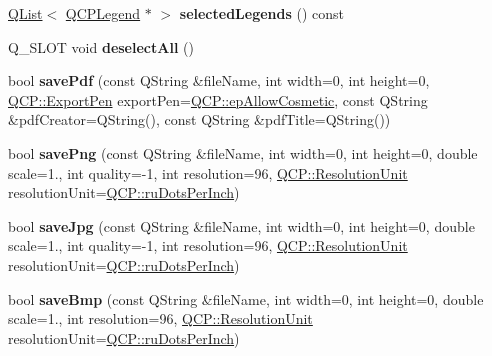 \begin{DoxyCompactItemize}
\item 
\hyperlink{class_q_list}{Q\+List}$<$ \hyperlink{class_q_c_p_legend}{Q\+C\+P\+Legend} $\ast$ $>$ {\bfseries selected\+Legends} () const \hypertarget{class_q_custom_plot_aafa931a82d7568af2ca51e5f939ff39a}{}\label{class_q_custom_plot_aafa931a82d7568af2ca51e5f939ff39a}

\item 
Q\+\_\+\+S\+L\+OT void {\bfseries deselect\+All} ()\hypertarget{class_q_custom_plot_a3b2698464e81b0771bdcaeb5bd306886}{}\label{class_q_custom_plot_a3b2698464e81b0771bdcaeb5bd306886}

\item 
bool {\bfseries save\+Pdf} (const Q\+String \&file\+Name, int width=0, int height=0, \hyperlink{namespace_q_c_p_a17844f19e1019693a953e1eb93536d2f}{Q\+C\+P\+::\+Export\+Pen} export\+Pen=\hyperlink{namespace_q_c_p_a17844f19e1019693a953e1eb93536d2fa34716c7388ad3a2ff3ac27e57fb83a5b}{Q\+C\+P\+::ep\+Allow\+Cosmetic}, const Q\+String \&pdf\+Creator=Q\+String(), const Q\+String \&pdf\+Title=Q\+String())\hypertarget{class_q_custom_plot_ad5acd34f6b39c3516887d7e54fec2412}{}\label{class_q_custom_plot_ad5acd34f6b39c3516887d7e54fec2412}

\item 
bool {\bfseries save\+Png} (const Q\+String \&file\+Name, int width=0, int height=0, double scale=1., int quality=-\/1, int resolution=96, \hyperlink{namespace_q_c_p_a715d46153da230990aa887d0f0602452}{Q\+C\+P\+::\+Resolution\+Unit} resolution\+Unit=\hyperlink{namespace_q_c_p_a715d46153da230990aa887d0f0602452a9def6fd83de9b4108ad999541a42ac6a}{Q\+C\+P\+::ru\+Dots\+Per\+Inch})\hypertarget{class_q_custom_plot_ac92cc9256d12f354b40a4be4600b5fb9}{}\label{class_q_custom_plot_ac92cc9256d12f354b40a4be4600b5fb9}

\item 
bool {\bfseries save\+Jpg} (const Q\+String \&file\+Name, int width=0, int height=0, double scale=1., int quality=-\/1, int resolution=96, \hyperlink{namespace_q_c_p_a715d46153da230990aa887d0f0602452}{Q\+C\+P\+::\+Resolution\+Unit} resolution\+Unit=\hyperlink{namespace_q_c_p_a715d46153da230990aa887d0f0602452a9def6fd83de9b4108ad999541a42ac6a}{Q\+C\+P\+::ru\+Dots\+Per\+Inch})\hypertarget{class_q_custom_plot_a76f0d278e630a711fa6f48048cfd83e4}{}\label{class_q_custom_plot_a76f0d278e630a711fa6f48048cfd83e4}

\item 
bool {\bfseries save\+Bmp} (const Q\+String \&file\+Name, int width=0, int height=0, double scale=1., int resolution=96, \hyperlink{namespace_q_c_p_a715d46153da230990aa887d0f0602452}{Q\+C\+P\+::\+Resolution\+Unit} resolution\+Unit=\hyperlink{namespace_q_c_p_a715d46153da230990aa887d0f0602452a9def6fd83de9b4108ad999541a42ac6a}{Q\+C\+P\+::ru\+Dots\+Per\+Inch})\hypertarget{class_q_custom_plot_ae3a86ed0795670e50afa21759d4fa13d}{}\label{class_q_custom_plot_ae3a86ed0795670e50afa21759d4fa13d}


\end{DoxyCompactItemize}
